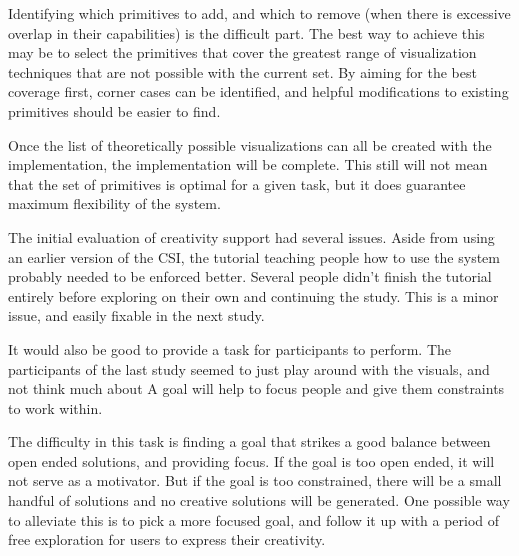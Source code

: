 Identifying which primitives to add, and which to remove (when there is excessive overlap in their capabilities) is the difficult part.
The best way to achieve this may be to select the primitives that cover the greatest range of visualization techniques that are not possible with the current set.
By aiming for the best coverage first, corner cases can be identified, and helpful modifications to existing primitives should be easier to find.

Once the list of theoretically possible visualizations can all be created with the implementation, the implementation will be complete.
This still will not mean that the set of primitives is optimal for a given task, but it does guarantee maximum flexibility of the system.

\label{creativitySupportFW}
The initial evaluation of creativity support had several issues.
Aside from using an earlier version of the CSI, the tutorial teaching people how to use the system probably needed to be enforced better.
Several people didn't finish the tutorial entirely before exploring on their own and continuing the study.
This is a minor issue, and easily fixable in the next study.

It would also be good to provide a task for participants to perform.
The participants of the last study seemed to just play around with the visuals, and not think much about 
A goal will help to focus people and give them constraints to work within.

The difficulty in this task is finding a goal that strikes a good balance between open ended solutions, and providing focus.
If the goal is too open ended, it will not serve as a motivator.
But if the goal is too constrained, there will be a small handful of solutions and no creative solutions will be generated.
One possible way to alleviate this is to pick a more focused goal, and follow it up with a period of free exploration for users to express their creativity.